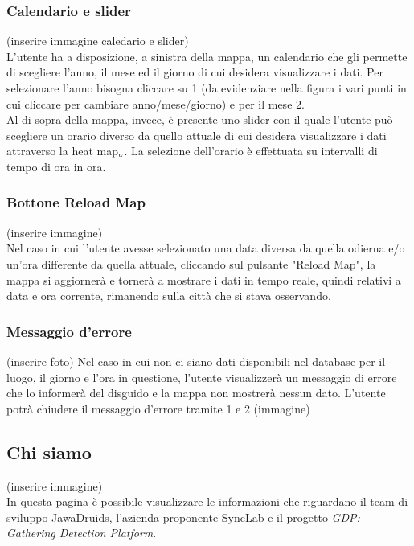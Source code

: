 \subsubsection{Calendario e slider}\label{UtilizzoDiGDPGatheringDetecionPlatformContenutoCentralePaginaInizialeHomeCalendarioESlider}
(inserire immagine caledario e slider) \\
L'utente ha a disposizione, a sinistra della mappa, un calendario che gli permette di scegliere l'anno, il mese ed il giorno di cui desidera visualizzare i dati. Per selezionare l'anno bisogna cliccare su 1 (da evidenziare nella figura i vari punti in cui cliccare per cambiare anno/mese/giorno) e per il mese 2.
\\
Al di sopra della mappa, invece, è presente uno slider con il quale l'utente può scegliere un orario diverso da quello attuale di cui desidera visualizzare i dati attraverso la heat map$_{\scaleto{G}{3pt}}$. La selezione dell'orario è effettuata su intervalli di tempo di ora in ora. 

\subsubsection{Bottone Reload Map} \label{UtilizzoDiGDPGatheringDetecionPlatformContenutoCentralePaginaInizialeHomeBottoneReloadMap}
(inserire immagine)\\
Nel caso in cui l'utente avesse selezionato una data diversa da quella odierna e/o un'ora differente da quella attuale, cliccando sul pulsante "Reload Map", la mappa si aggiornerà e tornerà a mostrare i dati in tempo reale, quindi relativi a data e ora corrente, rimanendo sulla città che si stava osservando. 
\subsubsection{Messaggio d'errore} \label{UtilizzoDiGDPGatheringDetecionPlatformContenutoCentralePaginaInizialeHomeMessaggioDiErrore}
(inserire foto)
Nel caso in cui non ci siano dati disponibili nel database per il luogo, il giorno e l'ora in questione, l'utente visualizzerà un messaggio di errore che lo informerà del disguido e la mappa non mostrerà nessun dato. L'utente potrà chiudere il messaggio d'errore tramite 1 e 2 (immagine)
\subsection{Chi siamo} \label{UtilizzoDiGDPGatheringDetecionPlatformContenutoCentraleChiSiamo}
(inserire immagine)\\
In questa pagina è possibile visualizzare le informazioni che riguardano il team di sviluppo JawaDruids, l'azienda proponente SyncLab e il progetto \textit{GDP: Gathering Detection Platform}. 

